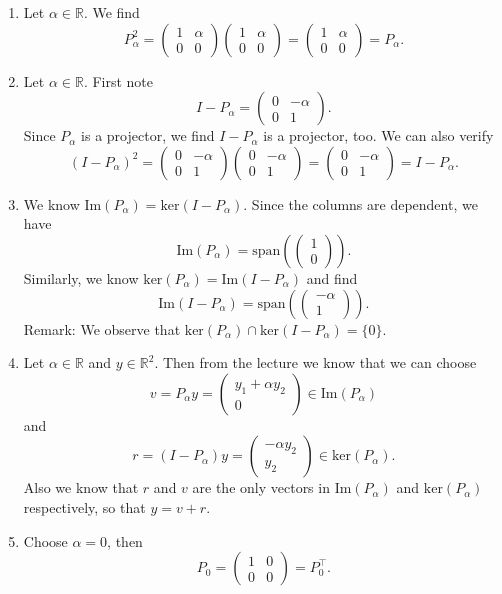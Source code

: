 \begin{enumerate}
	\item Let $\alpha \in \mathbb{R}$. We find $$P_\alpha^2 =\begin{pmatrix}
	1 & \alpha\\
	0 & 0
	\end{pmatrix}\begin{pmatrix}
	1 & \alpha\\
	0 & 0
	\end{pmatrix} = \begin{pmatrix}
	1 & \alpha\\
	0 & 0
	\end{pmatrix} = P_\alpha.$$
	\item Let $\alpha \in \mathbb{R}$. First note $$I- P_\alpha =  \begin{pmatrix}
	0 & -\alpha\\
	0 & 1
	\end{pmatrix}. $$
	Since $P_\alpha$ is a projector, we find $I-P_\alpha$ is a projector, too. We can also verify
	$$(I- P_\alpha )^2=  \begin{pmatrix}
	0 & -\alpha\\
	0 & 1
	\end{pmatrix}\begin{pmatrix}
	0 & -\alpha\\
	0 & 1
	\end{pmatrix} = \begin{pmatrix}
	0 & -\alpha\\
	0 & 1
	\end{pmatrix}=I- P_\alpha . $$
	\item We know $\text{Im}(P_\alpha) = \text{ker}(I-P_\alpha)$. Since the columns are dependent, we have
	$$\text{Im}(P_\alpha) = \text{span}(\begin{pmatrix}
	1\\
	0
	\end{pmatrix}).$$
	Similarly, we know $\text{ker}(P_\alpha)=\text{Im}(I-P_\alpha)$ and find 
		$$\text{Im}(I-P_\alpha) = \text{span}(\begin{pmatrix}
	-\alpha\\
	1
	\end{pmatrix}).$$
	Remark: We observe that $\text{ker}(P_\alpha) \cap \text{ker}(I-P_\alpha) = \{0\}$.
	\item Let $\alpha \in \mathbb{R}$ and $y \in \mathbb{R}^2$. Then from the lecture we know that  we can choose
	$$v=P_\alpha y = \begin{pmatrix}
	y_1 + \alpha y_2\\
	0
	\end{pmatrix} \in \text{Im}(P_\alpha)$$ 
	and
	$$r = (I-P_\alpha) y = \begin{pmatrix}
	-\alpha y_2\\
	y_2
	\end{pmatrix} \in \text{ker}(P_\alpha).$$
	Also we know that $r$ and $v$ are the only vectors in $\text{Im}(P_\alpha)$ and $\text{ker}(P_\alpha) $ respectively, so that $y = v +r $.
	\item Choose $\alpha = 0$, then
	$$P_0 = \begin{pmatrix}
	1 & 0\\
	0 & 0
	\end{pmatrix}  = P_0^\top. $$
\end{enumerate}